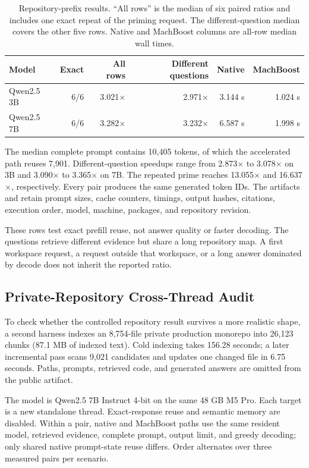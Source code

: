 \documentclass[11pt]{article}
\begin{document}
\begin{table}[H]
\centering
\small
\begin{tabular}{lrrrrr}
\toprule
Model & Exact & All rows & Different questions & Native & MachBoost \\
\midrule
Qwen2.5 3B & 6/6 & 3.021$\times$ & 2.971$\times$ & 3.144 s & 1.024 s \\
Qwen2.5 7B & 6/6 & 3.282$\times$ & 3.232$\times$ & 6.587 s & 1.998 s \\
\bottomrule
\end{tabular}
\caption{Repository-prefix results. ``All rows'' is the median of six paired
ratios and includes one exact repeat of the priming request. The
different-question median covers the other five rows. Native and MachBoost
columns are all-row median wall times.}
\label{tab:workspaceprefix}
\end{table}

The median complete prompt contains 10,405 tokens, of which the accelerated
path reuses 7,901. Different-question speedups range from 2.873$\times$ to
3.078$\times$ on 3B and 3.090$\times$ to 3.365$\times$ on 7B. The repeated
prime reaches 13.055$\times$ and 16.637$\times$, respectively. Every pair
produces the same generated token IDs. The artifacts
 and
 retain prompt sizes,
cache counters, timings, output hashes, citations, execution order, model,
machine, packages, and repository revision.

These rows test exact prefill reuse, not answer quality or faster decoding. The
questions retrieve different evidence but share a long repository map. A first
workspace request, a request outside that workspace, or a long answer dominated
by decode does not inherit the reported ratio.

\subsection{Private-Repository Cross-Thread Audit}
To check whether the controlled repository result survives a more realistic
shape, a second harness indexes an 8,754-file private production monorepo into
26,123 chunks (87.1 MB of indexed text). Cold indexing takes 156.28 seconds; a
later incremental pass scans 9,021 candidates and updates one changed file in
6.75 seconds. Paths, prompts, retrieved code, and generated answers are omitted
from the public artifact.

The model is Qwen2.5 7B Instruct 4-bit on the same 48 GB M5 Pro. Each target is
a new standalone thread. Exact-response reuse and semantic memory are disabled.
Within a pair, native and MachBoost paths use the same resident model, retrieved
evidence, complete prompt, output limit, and greedy decoding; only shared native
prompt-state reuse differs. Order alternates over three measured pairs per
scenario.
\end{document}
